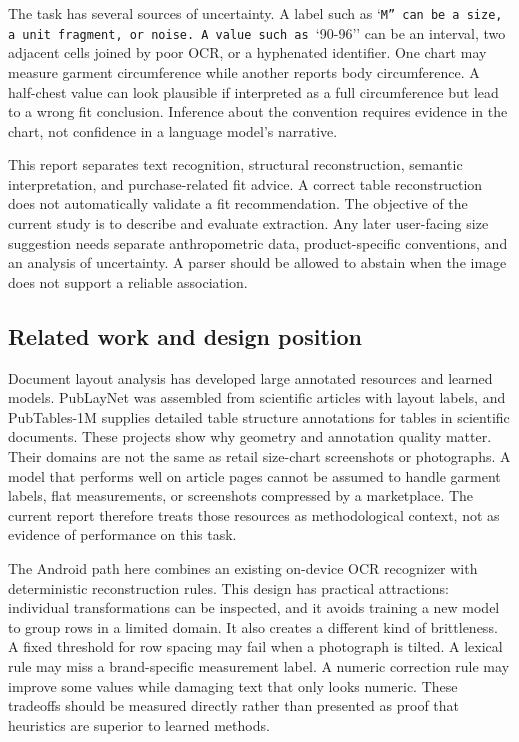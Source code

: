 \documentclass[10pt,letterpaper]{article}
\begin{document}
The task has several sources of uncertainty. A label such as `\texttt{M'' can be a size, a unit fragment, or noise. A value such as }`90-96'' can be an interval, two adjacent cells joined by poor OCR, or a hyphenated identifier. One chart may measure garment circumference while another reports body circumference. A half-chest value can look plausible if interpreted as a full circumference but lead to a wrong fit conclusion. Inference about the convention requires evidence in the chart, not confidence in a language model's narrative.

This report separates text recognition, structural reconstruction, semantic interpretation, and purchase-related fit advice. A correct table reconstruction does not automatically validate a fit recommendation. The objective of the current study is to describe and evaluate extraction. Any later user-facing size suggestion needs separate anthropometric data, product-specific conventions, and an analysis of uncertainty. A parser should be allowed to abstain when the image does not support a reliable association.

\subsection{Related work and design position}

Document layout analysis has developed large annotated resources and learned models. PubLayNet \cite{r2} was assembled from scientific articles with layout labels, and PubTables-1M \cite{r3} supplies detailed table structure annotations for tables in scientific documents. These projects show why geometry and annotation quality matter. Their domains are not the same as retail size-chart screenshots or photographs. A model that performs well on article pages cannot be assumed to handle garment labels, flat measurements, or screenshots compressed by a marketplace. The current report therefore treats those resources as methodological context, not as evidence of performance on this task.

The Android path here combines an existing on-device OCR recognizer with deterministic reconstruction rules. This design has practical attractions: individual transformations can be inspected, and it avoids training a new model to group rows in a limited domain. It also creates a different kind of brittleness. A fixed threshold for row spacing may fail when a photograph is tilted. A lexical rule may miss a brand-specific measurement label. A numeric correction rule may improve some values while damaging text that only looks numeric. These tradeoffs should be measured directly rather than presented as proof that heuristics are superior to learned methods.
\end{document}
